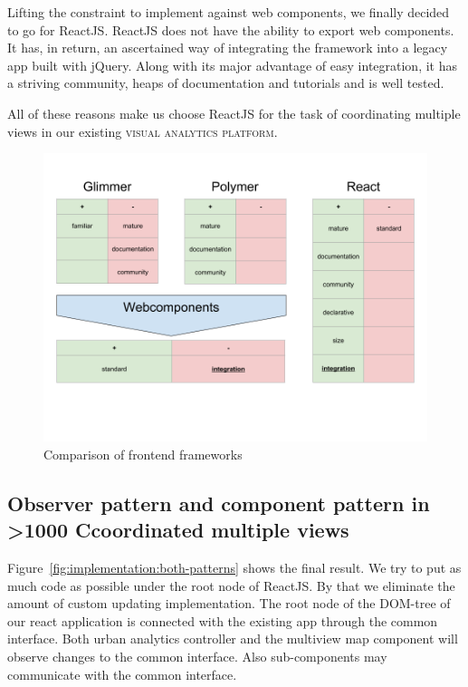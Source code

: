\documentclass{article}
\newcommand{\visan}{\textsc{visual analytics platform}}
\newcommand\hmm[1]{\ifnum\ifhmode\spacefactor\else2000\fi>1000 \uppercase{#1}\else#1\fi}
\newcommand{\cmvs}{\hmm{c}oordinated multiple views}
\begin{document}
Lifting the constraint to implement against web components, we finally decided to go for ReactJS\cite{React2017}.
ReactJS does not have the ability to export web components.
It has, in return, an ascertained way of integrating the framework into a legacy app built with jQuery.
Along with its major advantage of easy integration, it has a striving community, heaps of documentation and tutorials and is well tested.

All of these reasons make us choose ReactJS for the task of coordinating multiple views in our existing \visan{}.




\begin{figure}[h!]
  \centering
  \includegraphics[width=\textwidth]{images/frontend-frameworks.png}
  \caption{Comparison of frontend frameworks}\label{fig:implementation:frontend-frameworks}
\end{figure}

\subsection{Observer pattern and component pattern in \cmvs{}}
Figure~\ref{fig:implementation:both-patterns} shows the final result.
We try to put as much code as possible under the root node of ReactJS\@.
By that we eliminate the amount of custom updating implementation.
The root node of the DOM-tree of our react application is connected with the existing app through the common interface.
Both urban analytics controller and the multiview map component will observe changes to the common interface.
Also sub-components may communicate with the common interface.
\end{document}
